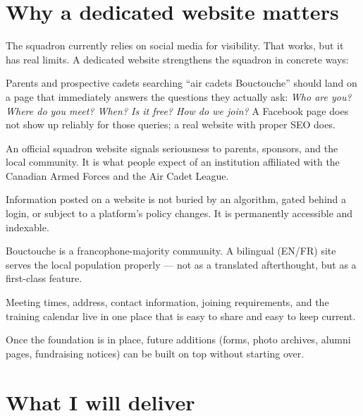 \documentclass[11pt,letterpaper]{article}
\begin{document}
\section{Why a dedicated website matters}

The squadron currently relies on social media for visibility. That works, but it has real limits. A dedicated website strengthens the squadron in concrete ways:

\begin{description}[style=nextline,leftmargin=1.4em,itemsep=0.4em]
  \item[Recruiting.] Parents and prospective cadets searching ``air cadets Bouctouche'' should land on a page that immediately answers the questions they actually ask: \emph{Who are you? Where do you meet? When? Is it free? How do we join?} A Facebook page does not show up reliably for those queries; a real website with proper SEO does.
  \item[Credibility.] An official squadron website signals seriousness to parents, sponsors, and the local community. It is what people expect of an institution affiliated with the Canadian Armed Forces and the Air Cadet League.
  \item[Independence from social platforms.] Information posted on a website is not buried by an algorithm, gated behind a login, or subject to a platform's policy changes. It is permanently accessible and indexable.
  \item[Bilingual service.] Bouctouche is a francophone-majority community. A bilingual (EN/FR) site serves the local population properly --- not as a translated afterthought, but as a first-class feature.
  \item[Single source of truth.] Meeting times, address, contact information, joining requirements, and the training calendar live in one place that is easy to share and easy to keep current.
  \item[A platform that grows with the squadron.] Once the foundation is in place, future additions (forms, photo archives, alumni pages, fundraising notices) can be built on top without starting over.
\end{description}

\section{What I will deliver}
\end{document}
